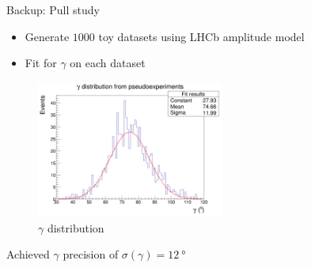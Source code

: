 \documentclass{beamer}
\begin{document}
\begin{frame}{Backup: Pull study}
  \begin{itemize}
    \item{Generate $1000$ toy datasets using LHCb amplitude model}
    \item{Fit for $\gamma$ on each dataset}
  \end{itemize}
  \begin{figure}
    \centering
    \includegraphics[width = 0.55\textwidth]{../Report/Plots/GammaDistribution8BinsVariableWidth.png}
    \caption{$\gamma$ distribution}
  \end{figure}
  \vspace{-0.5cm}
  \begin{center}
    Achieved $\gamma$ precision of $\sigma(\gamma) = \SI{12}{\degree}$
  \end{center}
\end{frame}
\end{document}
